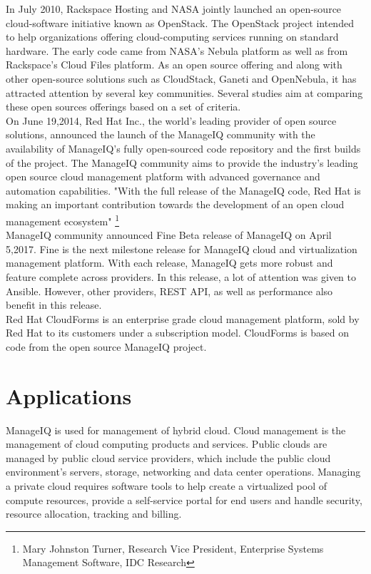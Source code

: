 \documentclass[a4paper,12pt]{report}
\begin{document}
In July 2010, Rackspace Hosting and NASA jointly launched an open-source cloud-software initiative known as OpenStack. The OpenStack project intended to help organizations offering cloud-computing services running on standard hardware. The early code came from NASA's Nebula platform as well as from Rackspace's Cloud Files platform. As an open source offering and along with other open-source solutions such as CloudStack, Ganeti and OpenNebula, it has attracted attention by several key communities. Several studies aim at comparing these open sources offerings based on a set of criteria.\\

On June 19,2014, Red Hat Inc., the world’s leading provider of open source solutions, announced the launch of the ManageIQ community with the availability of ManageIQ’s fully open-sourced code repository and the first builds of the project. The ManageIQ community aims to provide the industry's leading open source cloud management platform with advanced governance and automation capabilities.
"With the full release of the ManageIQ code, Red Hat is making an important contribution towards the development of an open cloud management ecosystem"
\footnote{Mary Johnston Turner, Research Vice President, Enterprise Systems Management Software, IDC Research}\\

ManageIQ community announced Fine Beta release of ManageIQ on April 5,2017. Fine is the next milestone release for ManageIQ cloud and virtualization management platform. With each release, ManageIQ gets more robust and feature complete across providers. In this release, a lot of attention was given to Ansible. However, other providers, REST API, as well as performance also benefit in this release.\\

Red Hat CloudForms is an enterprise grade cloud management platform, sold by Red Hat to its customers under a subscription model. CloudForms is based on code from the open source ManageIQ project.

\chapter{Applications}
ManageIQ is used for management of hybrid cloud. Cloud management is the management of cloud computing products and services. Public clouds are managed by public cloud service providers, which include the public cloud environment’s servers, storage, networking and data center operations. Managing a private cloud requires software tools to help create a virtualized pool of compute resources, provide a self-service portal for end users and handle security, resource allocation, tracking and billing.\\
\end{document}
